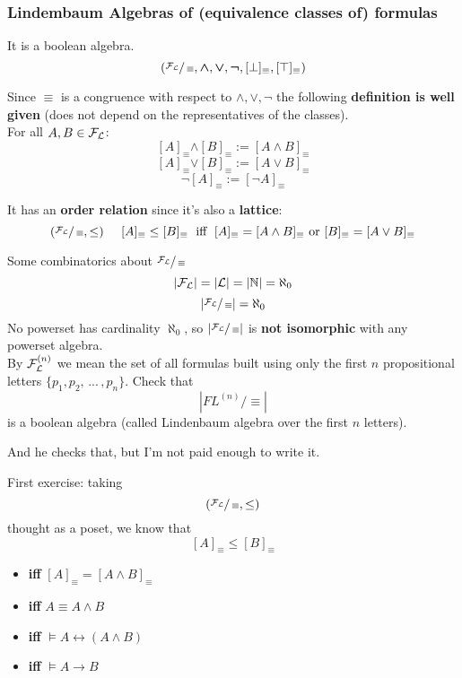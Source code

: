 \documentclass[11pt]{article}
\begin{document}
	\newpage
	
	\subsubsection{Lindembaum Algebras of (equivalence classes of) formulas}
	It is a boolean algebra.\\
	
	$$ (\sfrac{\mathcal{F}_\mathcal{L}}{\equiv}, \bm{\wedge}, \bm{\vee}, \bm{\neg}, [\bot]_\equiv, [\top]_\equiv) $$
	
	Since $\equiv$ is a congruence with respect to $\wedge, \vee, \neg$ the following \textbf{definition is well given} (does not depend on the representatives of the classes).\\
	
	For all $A, B \in \mathcal{F}_\mathcal{L}$:
	$$ [A]_\equiv \bm{\wedge} [B]_\equiv := [A \wedge B]_\equiv $$
	$$ [A]_\equiv \bm{\vee} [B]_\equiv := [A \vee B]_\equiv $$
	$$ \neg [A]_\equiv := [\neg A]_\equiv $$
	
	It has an \textbf{order relation} since it's also a \textbf{lattice}: 
	$$ (\sfrac{\mathcal{F}_\mathcal{L}}{\equiv}, \leq) \;\;\;\;\; [A]_\equiv \leq [B]_\equiv  \; \text{ iff } \; [A]_\equiv = [A \wedge B]_\equiv \text{ or } [B]_\equiv = [A \vee B]_\equiv $$
	
	Some combinatorics about $\sfrac{\mathcal{F}_\mathcal{L}}{\equiv}$
	$$ |\mathcal{F}_\mathcal{L}| = |\mathcal{L}| = |\mathbb{N}| = \aleph_0 $$
	$$ |\sfrac{\mathcal{F}_\mathcal{L}}{\equiv}| = \aleph_0 $$
	No powerset has cardinality $\aleph_0$, so $|\sfrac{\mathcal{F}_\mathcal{L}}{\equiv}|$ is \textbf{not isomorphic} with any powerset algebra.\\
	
	By $\mathcal{F}_\mathcal{L}^{(n)}$ we mean the set of all formulas built using only the first $n$ propositional letters $\{p_1, p_2, \, ... \, , p_n\}$. Check that  %
	$$ |FL^{(n)}/\equiv|$$
	is a boolean algebra (called Lindenbaum algebra over the first $n$ letters).\\
	
	\vfill 
	
	And he checks that, but I'm not paid enough to write it.\\
	
	
	
	\newpage
	
	First exercise: taking 
	$$ (\sfrac{\mathcal{F}_\mathcal{L}}{\equiv}, \leq)$$
	thought as a poset, we know that 
	$$ [A]_\equiv \leq [B]_\equiv $$
	
	\begin{itemize}[label*=]
		\item \textbf{iff} $[A]_\equiv = [A \wedge B]_\equiv $
		\item \textbf{iff} $A \equiv A \wedge B$
		\item \textbf{iff} $\models A \leftrightarrow (A \wedge B)$ 
		\item \textbf{iff} $\models A \rightarrow B$
	\end{itemize}
	
\end{document}
